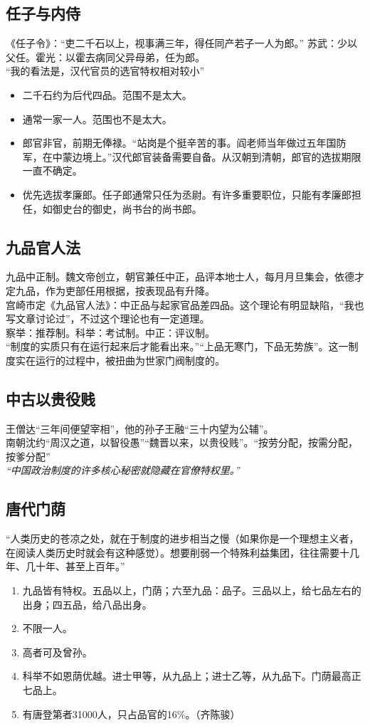 \documentclass[twoside]{article}
\begin{document}
\subsection{任子与内侍}
《任子令》：``吏二千石以上，视事满三年，得任同产若子一人为郎。''
苏武：少以父任。霍光：以霍去病同父异母弟，任为郎。\\
``我的看法是，汉代官员的选官特权相对较小''
\begin{itemize}
	\item 二千石约为后代四品。范围不是太大。
	\item 通常一家一人。范围也不是太大。
	\item 郎官非官，前期无俸禄。``站岗是个挺辛苦的事。阎老师当年做过五年国防军，在中蒙边境上。''汉代郎官装备需要自备。从汉朝到清朝，郎官的选拔期限一直不确定。
	\item 优先选拔孝廉郎。任子郎通常只任为丞尉。有许多重要职位，只能有孝廉郎担任，如御史台的御史，尚书台的尚书郎。
\end{itemize}
\subsection{九品官人法}
九品中正制。魏文帝创立，朝官兼任中正，品评本地士人，每月月旦集会，依德才定九品，作为吏部任用根据，按表现品有升降。\\
宫崎市定《九品官人法》：中正品与起家官品差四品。这个理论有明显缺陷，``我也写文章讨论过''，不过这个理论也有一定道理。\\
察举：推荐制。科举：考试制。中正：评议制。\\
``制度的实质只有在运行起来后才能看出来。''``上品无寒门，下品无势族''。这一制度实在运行的过程中，被扭曲为世家门阀制度的。
\subsection{中古以贵役贱}
王僧达``三年间便望宰相''，他的孙子王融``三十内望为公辅''。\\
南朝沈约``周汉之道，以智役愚''``魏晋以来，以贵役贱''。``按劳分配，按需分配，按爹分配''\\
\textit{``中国政治制度的许多核心秘密就隐藏在官僚特权里。''}
\subsection{唐代门荫}
``人类历史的苍凉之处，就在于制度的进步相当之慢（如果你是一个理想主义者，在阅读人类历史时就会有这种感觉）。想要削弱一个特殊利益集团，往往需要十几年、几十年、甚至上百年。''
\begin{enumerate}
	\item 九品皆有特权。五品以上，门荫；六至九品：品子。三品以上，给七品左右的出身；四五品，给八品出身。
	\item 不限一人。
	\item 高者可及曾孙。
	\item 科举不如恩荫优越。进士甲等，从九品上；进士乙等，从九品下。门荫最高正七品上。
	\item 有唐登第者31000人，只占品官的16\%。（齐陈骏）
\end{enumerate}
\end{document}
